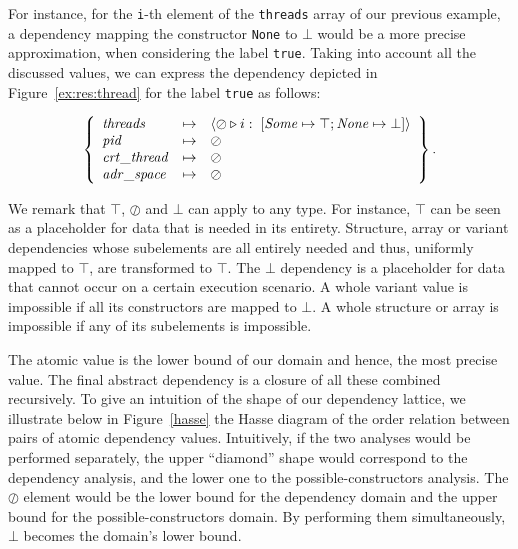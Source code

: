\documentclass[11pt]{article}
\newcommand{\disp}[1]{\lstinline&#1&}
\begin{document}
For instance, for the \disp{i}-th element of the \disp{threads} array of our 
previous example, a dependency mapping the constructor \disp{None} to $\bot$
would be a more precise approximation, when considering the label \disp{true}.
Taking into account all the discussed values, we can express the dependency 
depicted in Figure~\ref{ex:res:thread} for the label \disp{true} as follows:

\[
\left \{
\begin{array}{lll}
\mathit{threads} &\mapsto & \langle \oslash \triangleright i: \; [\mathit{Some} \mapsto \top; \mathit{None} \mapsto \bot] \rangle\\
\mathit{pid} &\mapsto &\oslash \\
\mathit{crt\_thread} &\mapsto &\oslash \\
\mathit{adr\_space} &\mapsto &\oslash\\
\end{array}
\right\}.
\]

We remark that $\top$, $\oslash$ and $\bot$ can apply to any type. For 
instance, $\top$ can be seen as a placeholder for data that is needed in its
entirety. Structure, array or variant dependencies whose subelements are all
entirely needed and thus, uniformly mapped to $\top$, are transformed to $\top$.
The $\bot$ dependency is a placeholder for data that cannot occur on a certain
execution scenario. A whole variant value is impossible if all its constructors
are mapped to $\bot$. A whole structure or array is impossible if any of its
subelements is impossible.
 
The {\impossible} atomic value is the lower bound of our domain and hence, the 
most precise value. The final abstract dependency is a closure of all these combined 
recursively. To give an intuition of the shape of our dependency lattice, we 
illustrate below in Figure~\ref{hasse} the Hasse diagram of the order relation 
between pairs of atomic dependency values. Intuitively, if the two analyses would
be performed separately, the upper ``diamond'' shape would correspond to the 
dependency analysis, and the lower one to the possible-constructors analysis. The
$\oslash$ element would be the lower bound for the dependency domain and the upper
bound for the possible-constructors domain. By performing them simultaneously, 
$\bot$ becomes the domain's lower bound.
\end{document}
